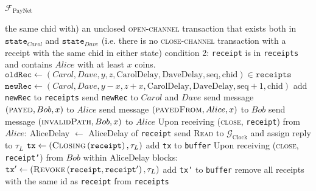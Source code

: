 \begin{functionality}{$\mathcal{F}_{\mathrm{PayNet}}$}
\begin{algorithmic}[1]
      the same chid with) an unclosed \textsc{open-channel} transaction that
      exists both in $\mathtt{state}_{Carol}$ and $\mathtt{state}_{Dave}$ (i.e.
      there is no \textsc{close-channel} transaction with a receipt with the
      same chid in either state)
      \State condition 2: \texttt{receipt} is in \texttt{receipts} and contains
      $Alice$ with at least $x$ coins.
          \State $\mathtt{oldRec} \gets \left(Carol, Dave, y, z,
          \mathrm{CarolDelay}, \mathrm{DaveDelay}, \mathrm{seq},
          \mathrm{chid}\right) \in \mathtt{receipts}$
          \State $\mathtt{newRec} \gets \left(Carol, Dave, y - x, z + x,
          \mathrm{CarolDelay}, \mathrm{DaveDelay}, \mathrm{seq} + 1,
          \mathrm{chid}\right)$
          \State add \texttt{newRec} to \texttt{receipts}
          \State send \texttt{newRec} to $Carol$ and $Dave$
        \EndFor
        \State send message $\left(\textsc{payed}, Bob, x\right)$ to $Alice$
        \State send message $\left(\textsc{payedFrom}, Alice, x\right)$ to $Bob$
      \Else
        \State send message $\left(\textsc{invalidPath}, Bob, x\right)$ to
        $Alice$
      \EndIf
    \EndIndent
    \State
    \State Upon receiving (\textsc{close}, \texttt{receipt}) from $Alice$:
    \Indent
        \State AliceDelay $\gets$ AliceDelay of \texttt{receipt}
        \State send \textsc{Read} to $\mathcal{G}_{\mathrm{Clock}}$ and assign
        reply to $\tau_L$
        \State $\mathtt{tx} \gets
        \left(\textsc{Closing}\left(\mathtt{receipt}\right), \tau_L\right)$
        \State add \texttt{tx} to \texttt{buffer}
        \State Upon receiving (\textsc{close}, \texttt{receipt'}) from $Bob$
        within AliceDelay blocks:
          \State $\mathtt{tx'} \gets
          \left(\textsc{Revoke}\left(\mathtt{receipt}, \mathtt{receipt'}\right),
          \tau_L\right)$
          \State add \texttt{tx'} to \texttt{buffer} 
        \EndIf
        \State remove all receipts with the same id as \texttt{receipt} from
        \texttt{receipts}
      \EndIf
    \EndIndent
  \end{algorithmic}
\end{functionality}
